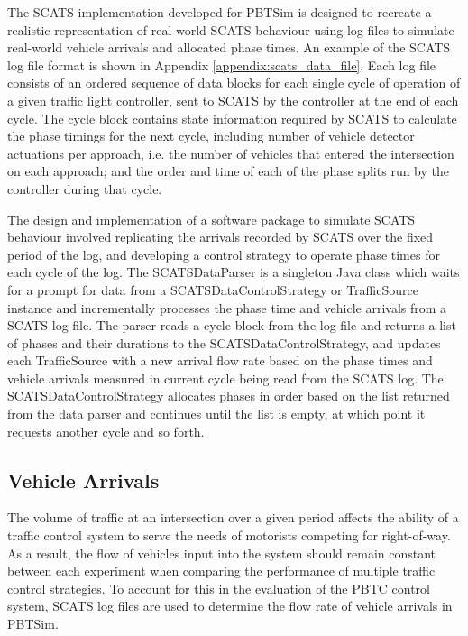 The SCATS implementation developed for PBTSim is designed to recreate a realistic representation of real-world SCATS behaviour using log files to simulate real-world vehicle arrivals and allocated phase times. An example of the SCATS log file format is shown in Appendix \ref{appendix:scats_data_file}. Each log file consists of an ordered sequence of data blocks for each single cycle of operation of a given traffic light controller, sent to SCATS by the controller at the end of each cycle. The cycle block contains state information required by SCATS to calculate the phase timings for the next cycle, including number of vehicle detector actuations per approach, i.e. the number of vehicles that entered the intersection on each approach; and the order and time of each of the phase splits run by the controller during that cycle. 

The design and implementation of a software package to simulate SCATS behaviour involved replicating the arrivals recorded by SCATS over the fixed period of the log, and developing a control strategy to operate phase times for each cycle of the log. The SCATSDataParser is a singleton Java class which waits for a prompt for data from a SCATSDataControlStrategy or TrafficSource instance and incrementally processes the phase time and vehicle arrivals from a SCATS log file. The parser reads a cycle block from the log file and returns a list of phases and their durations to the SCATSDataControlStrategy, and updates each TrafficSource with a new arrival flow rate based on the phase times and vehicle arrivals measured in current cycle being read from the SCATS log. The SCATSDataControlStrategy allocates phases in order based on the list returned from the data parser and continues until the list is empty, at which point it requests another cycle and so forth.

\subsection{Vehicle Arrivals}

The volume of traffic at an intersection over a given period affects the ability of a traffic control system to serve the needs of motorists competing for right-of-way. As a result, the flow of vehicles input into the system should remain constant between each experiment when comparing the performance of multiple traffic control strategies. To account for this in the evaluation of the PBTC control system, SCATS log files are used to determine the flow rate of vehicle arrivals in PBTSim. 

